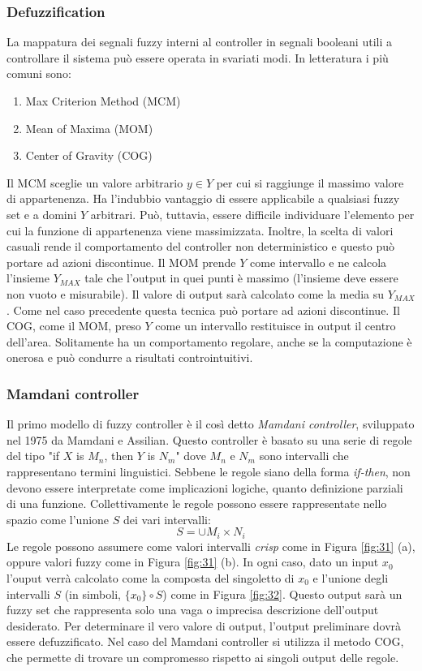 \documentclass[10pt,a4paper]{article}
\begin{document}
\subsubsection{Defuzzification}

La mappatura dei segnali fuzzy interni al controller in segnali booleani utili a controllare il sistema può essere operata in svariati modi. In letteratura i più comuni sono:

\begin{enumerate}
\item{Max Criterion Method (MCM)}
\item{Mean of Maxima (MOM)}
\item{Center of Gravity (COG)}
\end{enumerate}

Il MCM sceglie un valore arbitrario $y \in Y$ per cui si raggiunge il massimo valore di appartenenza. Ha l'indubbio vantaggio di essere applicabile a qualsiasi fuzzy set e a domini $Y$ arbitrari. Può, tuttavia, essere difficile individuare l'elemento per cui la funzione di appartenenza viene massimizzata. Inoltre, la scelta di valori casuali rende il comportamento del controller non deterministico e questo può portare ad azioni discontinue.
Il MOM  prende $Y$ come intervallo e ne calcola l'insieme $Y_{MAX}$ tale che l'output in quei punti è massimo (l'insieme deve essere non vuoto e misurabile). Il valore di output sarà calcolato come la media su $Y_{MAX}$. Come nel caso precedente questa tecnica può portare ad azioni discontinue. 
Il COG, come il MOM, preso $Y$ come un intervallo restituisce in output il centro dell'area. Solitamente ha un comportamento regolare, anche se la computazione è onerosa e può condurre a risultati controintuitivi. 


\subsubsection{Mamdani controller}

Il primo modello di fuzzy controller è il così detto \emph{Mamdani controller}, sviluppato nel 1975 da Mamdani e Assilian. Questo controller è basato su una serie di regole del tipo "if $X$ is $M_n$, then $Y$ is $N_m$" dove $M_n$ e $N_m$ sono intervalli che rappresentano termini linguistici. Sebbene le regole siano della forma \emph{if-then}, non devono essere interpretate come implicazioni logiche, quanto definizione parziali di una funzione. Collettivamente le regole possono essere rappresentate nello spazio come l'unione $S$ dei vari intervalli:
$$
S = \cup M_i \times N_i
$$
Le regole possono assumere come valori intervalli \emph{crisp} come in Figura \ref{fig:31} (a), oppure valori fuzzy come in Figura \ref{fig:31} (b). In ogni caso, dato un input $x_0$ l'ouput verrà calcolato come la composta del singoletto di $x_0$ e l'unione degli intervalli $S$ (in simboli, $\{x_0\} \circ S$) come in Figura \ref{fig:32}. Questo output sarà un fuzzy set che rappresenta solo una vaga o imprecisa descrizione dell'output desiderato. Per determinare il vero valore di output, l'output preliminare dovrà essere defuzzificato. Nel caso del Mamdani controller si utilizza il metodo COG, che permette di trovare un compromesso rispetto ai singoli output delle regole.
 
\end{document}
